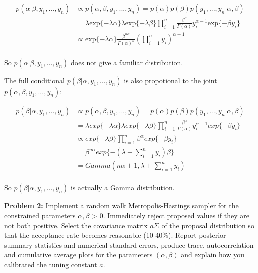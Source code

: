 \documentclass[12pt]{article}
\begin{document}
\begin{equation*}
\begin{split}
p(\alpha | \beta, y_1,...,y_n) &\propto p(\alpha, \beta, y_1,...,y_n) = p(\alpha)p(\beta)p(y_1,...,y_n|\alpha,\beta) \\
&= \lambda \text{exp}\{-\lambda \alpha\} \lambda \text{exp}\{-\lambda \beta\}\prod_{i=1}^n \frac{\beta^{\alpha}}{\Gamma(\alpha)}y_i^{\alpha-1}\text{exp}\{-\beta y_i\} \\
&\propto \text{exp}\{-\lambda\alpha\}\frac{\beta^{n\alpha}}{\Gamma(\alpha)^n}(\prod_{i=1}^n y_i)^{\alpha-1} \\
\end{split}
\end{equation*}

So $p(\alpha | \beta, y_1,...,y_n)$ does not give a familiar distribution.

The full conditional $p(\beta | \alpha, y_1,...,y_n)$ is also propotional to the joint $p(\alpha, \beta, y_1,...,y_n)$:

\begin{equation}
\begin{split}
p(\beta | \alpha, y_1,...,y_n) &\propto p(\alpha, \beta, y_1,...,y_n) = p(\alpha)p(\beta)p(y_1,...,y_n|\alpha,\beta) \\
&= \lambda exp\{-\lambda \alpha\} \lambda exp\{-\lambda \beta\}\prod_{i=1}^n \frac{\beta^{\alpha}}{\Gamma(\alpha)}y_i^{\alpha-1}exp\{-\beta y_i\} \\
&\propto exp\{-\lambda \beta\} \prod_{i=1}^n \beta^{\alpha} exp\{-\beta y_i\}\\
&= \beta^{n \alpha} exp\{-(\lambda+\sum_{i=1}^n y_i)\beta \} \\
&= Gamma(n\alpha+1, \lambda+\sum_{i=1}^n y_i) \\
\end{split}
\end{equation}

So $p(\beta | \alpha, y_1,...,y_n)$ is actually a Gamma distribution.

\vspace{10mm}

\textbf{Problem 2:} Implement a random walk Metropolis-Hastings sampler for the constrained parameters $\alpha, \beta$ > $0$. Immediately reject proposed values if they are not both positive. Select the covariance matrix $a\Sigma$ of the proposal distribution so that the acceptance rate becomes reasonable (10-40\%). Report posterior summary statistics and numerical standard errors, produce trace, autocorrelation and cumulative average plots for the parameters $(\alpha, \beta)$ and explain how you calibrated the tuning constant $a$.
\end{document}

